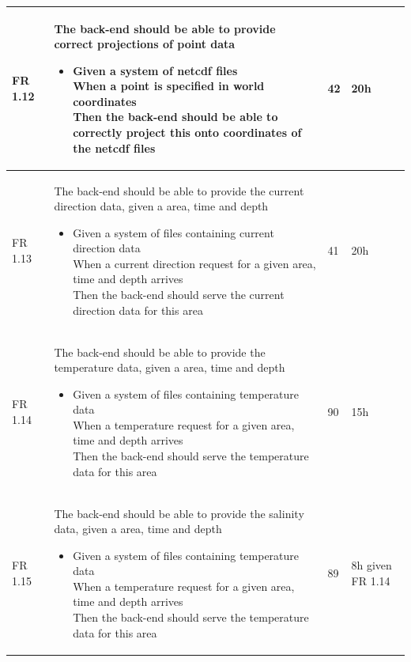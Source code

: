 \documentclass[11pt,a4paper,titlepage,oneside]{report}
\begin{document}
\begin{longtable}{p{1.4cm} p{7.8cm} p{1cm} p{1cm} }
  FR 1.12 & The \gls{back-end} should be able to provide correct projections of point data
  \begin{itemize}
  \item \parbox[t]{6.8cm}{
        Given a system of \gls{netcdf} files \\
        When a point is specified in world coordinates \\
        Then the \gls{back-end} should be able to correctly project this onto coordinates of the \gls{netcdf} files}
  \end{itemize}
  & 42 & 20h \\ \hline

  FR 1.13 & The \gls{back-end} should be able to provide the current direction data, given a area, time and depth
  \begin{itemize}
  \item \parbox[t]{6.8cm}{
        Given a system of files containing current direction data \\
        When a current direction request for a given area, time and depth arrives \\
        Then the \gls{back-end} should serve the current direction data for this area}
  \end{itemize}
  & 41 & 20h \\ \hline

  FR 1.14 & The \gls{back-end} should be able to provide the temperature data, given a area, time and depth
  \begin{itemize}
  \item \parbox[t]{6.8cm}{
        Given a system of files containing temperature data \\
        When a temperature request for a given area, time and depth arrives \\
        Then the \gls{back-end} should serve the temperature data for this area}
  \end{itemize}
  & 90 & 15h \\ \hline

  FR 1.15 & The \gls{back-end} should be able to provide the salinity data, given a area, time and depth
  \begin{itemize}
  \item \parbox[t]{6.8cm}{
        Given a system of files containing temperature data \\
        When a temperature request for a given area, time and depth arrives \\
        Then the \gls{back-end} should serve the temperature data for this area}
  \end{itemize}
  & 89 & 8h given FR 1.14 \\ \hline


\end{longtable}
\end{document}
